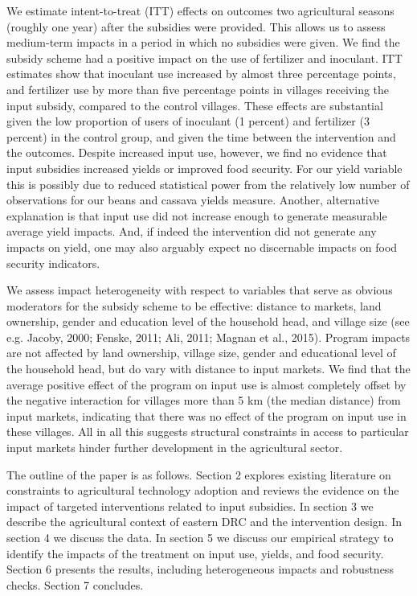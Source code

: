 We estimate intent-to-treat (ITT) effects on outcomes two agricultural seasons (roughly one year) after the subsidies were provided. This allows us to assess medium-term impacts in a period in which no subsidies were given. We find the subsidy scheme had a positive impact on the use of fertilizer and inoculant. ITT estimates show that inoculant use increased by almost three percentage points, and fertilizer use by more than five percentage points in villages receiving the input subsidy, compared to the control villages. These effects are substantial given the low proportion of users of inoculant (1 percent) and fertilizer (3 percent) in the control group, and given the time between the intervention and the outcomes. Despite increased input use, however, we find no evidence that input subsidies increased yields or improved food security. For our yield variable this is possibly due to reduced statistical power from the relatively low number of observations for our beans and cassava yields measure. Another, alternative explanation is that input use did not increase enough to generate measurable average yield impacts. And, if indeed the intervention did not generate any impacts on yield, one may also arguably expect no discernable impacts on food security indicators. 

We assess impact heterogeneity with respect to variables that serve as obvious moderators for the subsidy scheme to be effective: distance to markets, land ownership, gender and education level of the household head, and village size (see e.g. Jacoby, 2000; Fenske, 2011; Ali, 2011; Magnan et al., 2015). Program impacts are not affected by land ownership, village size, gender and educational level of the household head, but do vary with distance to input markets. We find that the average positive effect of the program on input use is almost completely offset by the negative interaction for villages more than 5 km (the median distance) from input markets, indicating that there was no effect of the program on input use in these villages. All in all this suggests structural constraints in access to particular input markets hinder further development in the agricultural sector.

The outline of the paper is as follows. Section 2 explores existing literature on constraints to agricultural technology adoption and reviews the evidence on the impact of targeted interventions related to input subsidies. In section 3 we describe the agricultural context of eastern DRC and the intervention design. In section 4 we discuss the data. In section 5 we discuss our empirical strategy to identify the impacts of the treatment on input use, yields, and food security. Section 6 presents the results, including heterogeneous impacts and robustness checks. Section 7 concludes.

